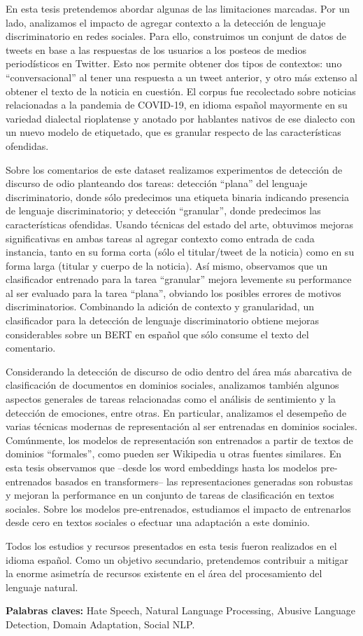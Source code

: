 {En esta tesis pretendemos abordar algunas de las limitaciones marcadas. Por un lado, analizamos el impacto de agregar contexto a la detección de lenguaje discriminatorio en redes sociales. Para ello, construimos un conjunt de datos de tweets en base a las respuestas de los usuarios a los posteos de medios periodísticos en Twitter. Esto nos permite obtener dos tipos de contextos: uno “conversacional” al tener una respuesta a un tweet anterior, y otro más extenso al obtener el texto de la noticia en cuestión. El corpus fue recolectado sobre noticias relacionadas a la pandemia de COVID-19, en idioma español mayormente en su variedad dialectal rioplatense y anotado por hablantes nativos de ese dialecto con un nuevo modelo de etiquetado, que es granular respecto de las características ofendidas.

Sobre los comentarios de este dataset realizamos experimentos de detección de discurso de odio planteando dos tareas: detección “plana” del lenguaje discriminatorio, donde sólo predecimos una etiqueta binaria indicando presencia de lenguaje discriminatorio; y detección “granular”, donde predecimos las características ofendidas. Usando técnicas del estado del arte, obtuvimos mejoras significativas en ambas tareas al agregar contexto como entrada de cada instancia, tanto en su forma corta (sólo el titular/tweet de la noticia) como en su forma larga (titular y cuerpo de la noticia). Así mismo, observamos que un clasificador entrenado para la tarea “granular” mejora levemente su performance al ser evaluado para la tarea “plana”, obviando los posibles errores de motivos discriminatorios. Combinando la adición de contexto y granularidad, un clasificador para la detección de lenguaje discriminatorio obtiene mejoras considerables sobre un BERT en español que sólo consume el texto del comentario.

Considerando la detección de discurso de odio dentro del área más abarcativa de clasificación de documentos en dominios sociales, analizamos también algunos aspectos generales de tareas relacionadas como el análisis de sentimiento y la detección de emociones, entre otras. En particular, analizamos el desempeño de varias técnicas modernas de representación al ser entrenadas en dominios sociales. Comúnmente, los modelos de representación son entrenados a partir de textos de dominios “formales”, como pueden ser Wikipedia u otras fuentes similares. En esta tesis observamos que –desde los word embeddings hasta los modelos pre-entrenados basados en transformers– las representaciones generadas son robustas y mejoran la performance en un conjunto de tareas de clasificación en textos sociales. Sobre los modelos pre-entrenados, estudiamos el impacto de entrenarlos desde cero en textos sociales o efectuar una adaptación a este dominio.

Todos los estudios y recursos presentados en esta tesis fueron realizados en el idioma español. Como un objetivo secundario, pretendemos contribuir a mitigar la enorme asimetría de recursos existente en el área del procesamiento del lenguaje natural.


}


\bigskip

\noindent\textbf{Palabras claves:} Hate Speech, Natural Language Processing, Abusive Language Detection, Domain Adaptation, Social NLP.